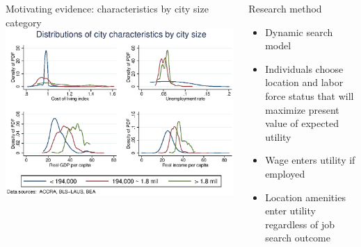 \documentclass[english,final,t]{beamer}
\begin{document}
\begin{frame}{}
\begin{part}{}
\begin{columns}[t]
    \begin{column}{.44\linewidth}
      \begin{block}{Motivating evidence: characteristics by city size category}
			\vspace{1ex}
      \centering
        \includegraphics[width=.9\linewidth]{alldist.eps}
        \vspace{-1ex}
      \end{block}
    \end{column}

    
    \begin{column}{.22\linewidth}

      \begin{block}{Research method}
        \begin{itemize}
        \item Dynamic search model
        \item Individuals choose location and labor force status that will maximize present value of expected utility
				\item Wage enters utility if employed
        \item Location amenities enter utility regardless of job search outcome
        \end{itemize}
        \vspace{1ex}
      \end{block}


\end{column}
\end{columns}
\end{part}
\end{frame}
\end{document}
